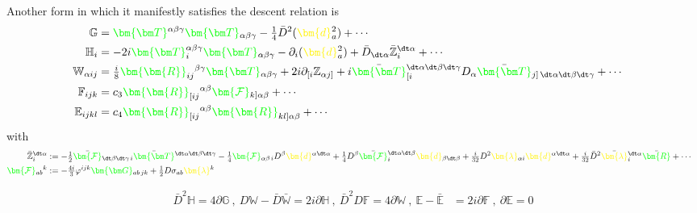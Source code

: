 \documentclass[letter,12pt]{article} %
\def\physical#1{ {\color{green} {\bm {#1}} } }
\def\auxiliary#1{ {\color{yellow} {\bm {#1}} } }
\def\FS#1{ { {\physical{\bm {#1}} } } }
\def\dX{ \auxiliary{d} }
\def\l{ \auxiliary{\lambda} }
\def\KK{\physical {\mathcal F}}
\def\Scalar{\physical R}
\def\G{ \physical{ {\bm G} } }
\def\Curvature{ \physical{ {\bm R} } }
\def\TorsionXXX{ \physical{ {\bm T} } }
\def\TorsionXXY{ \physical{ {\bm T} } }
\def\Curvature{ {\FS{R}} }
\begin{document}
Another form in which it manifestly satisfies the descent relation is
{\color{white}
\begin{align}
\mathbb G &= \TorsionXXX^{\alpha \beta \gamma} \TorsionXXX_{\alpha \beta \gamma}
	-\tfrac14 \bar D^2 (\dX_a^2)
	+\cdots	
\cr
\mathbb H_i &= 
-2i \TorsionXXY_i^{\alpha \beta \gamma} \TorsionXXX_{\alpha \beta \gamma}
	- \partial_i(\dX_a^2)
	+\bar D_{\dt \alpha} \bar {\mathbb Z}_i^{\dt \alpha}
	+\cdots	
\cr
\mathbb W_{\alpha ij} &= \tfrac i8 \Curvature_{ij}{}^{\beta \gamma} \TorsionXXX_{\alpha \beta \gamma}
	+2i \partial_{[i}\mathbb Z_{\alpha j]} 
	+ i \bar \TorsionXXY^{\dt \alpha \dt \beta \dt \gamma}_{[i} D_\alpha \bar \TorsionXXY_{j]\, \dt \alpha \dt \beta \dt \gamma}
	+\cdots	
\cr
\mathbb F_{ijk} &= c_3 \Curvature_{[ij}{}^{\alpha \beta} \KK_{k]\alpha \beta}
	+\cdots	
\cr
\mathbb E_{ijkl} &= c_4 \Curvature_{[ij}{}^{\alpha \beta} \Curvature_{kl] \alpha \beta} +\cdots 	
\nonumber 	
\end{align}
}
with
{%
\begin{align}
\bar {\mathbb Z}_i^{\dt \alpha}  &:= 
-\tfrac12 \bar \KK_{\dt \beta \dt \gamma \,i} \bar \TorsionXXX^{\dt \alpha \dt\beta \dt\gamma}
-\tfrac 14 \KK_{\alpha \beta\,i}D^\beta \dX^{\alpha \dt \alpha} 
+\tfrac 1{4} D^{\beta} \bar \KK_i^{\dt \alpha \dt \beta}  \dX_{\beta \dt \beta}
	+\tfrac i{32} D^2 \l_{\alpha i} \dX^{\alpha \dt \alpha} 
	+\tfrac i{32} \bar D^2 \bar \l_i^{\dt \alpha} \bar \Scalar
	+\cdots
\cr
\KK_{ab}{}^k &:= -\tfrac{4i}3 \varphi^{ijk} \G_{ab\, jk} + \tfrac12 D\sigma_{ab} \l^k
\nonumber	
\end{align}
}

{%
\begin{align}
\bar D^2 \mathbb H =  4\partial \mathbb G 
~,~
D\mathbb W - \bar D\bar {\mathbb W}= 2i\partial \mathbb H 
~,~
\bar D^2 D\mathbb F  = 4\partial \mathbb W 
~,~
\mathbb E - \bar {\mathbb E} &=  2i \partial \mathbb F
~,~
\partial \mathbb E = 0
\nonumber
\end{align}
}
\end{document}
